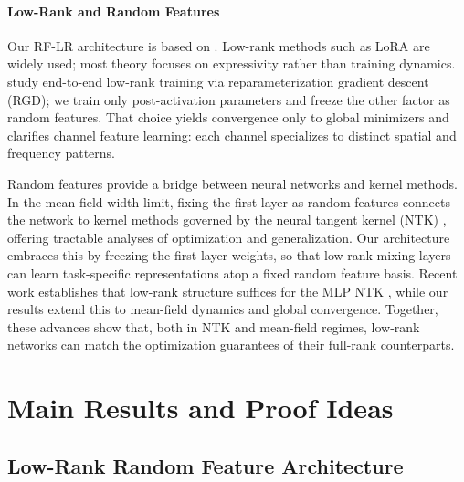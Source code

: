 \documentclass[nohyperref]{article}
\theoremstyle{plain}
\theoremstyle{definition}
\theoremstyle{remark}
\begin{document}
\paragraph{Low-Rank and Random Features}

Our RF-LR architecture is based on \cite{zhang2025structuredbalancedmulticomponentmultilayer}. Low-rank methods such as LoRA \cite{hu2021loralowrankadaptationlarge} are widely used; most theory focuses on expressivity rather than training dynamics. \cite{kamalakara2022exploringlowranktraining} study end-to-end low-rank training via reparameterization gradient descent (RGD); we train only post-activation parameters and freeze the other factor as random features. That choice yields convergence only to global minimizers and clarifies channel feature learning: each channel specializes to distinct spatial and frequency patterns.

Random features provide a bridge between neural networks and kernel methods. In the mean-field width limit, fixing the first layer as random features connects the network to kernel methods governed by the neural tangent kernel (NTK) \cite{jacot2018neural}, offering tractable analyses of optimization and generalization. Our architecture embraces this by freezing the first-layer weights, so that low-rank mixing layers can learn task-specific representations atop a fixed random feature basis. Recent work establishes that low-rank structure suffices for the MLP NTK \cite{author2024lowrankntk}, while our results extend this to mean-field dynamics and global convergence. Together, these advances show that, both in NTK and mean-field regimes, low-rank networks can match the optimization guarantees of their full-rank counterparts.













\section{Main Results and Proof Ideas}
\label{sec:theory}

\subsection{Low-Rank Random Feature Architecture}
\label{sec:setup}
\end{document}
